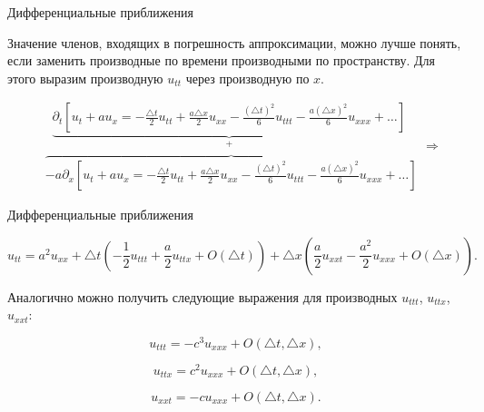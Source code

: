 \documentclass[10pt,xcolor=pst,aspectratio=169]{beamer}
\begin{document}
\begin{frame}{Дифференциальные приближения}

    \transdissolve[duration=0.1]
    \justifying
    \large

    Значение членов, входящих в погрешность аппроксимации, можно лучше понять, если заменить производные по времени производными по пространству. Для этого
выразим производную $u_{tt}$ через производную по $x$.

    \[
        \begin{split}
            &\; \; \underbrace{\partial_{t} \left[ u_{t} + a u_{x} = - \frac{\triangle t}{2} u_{tt} + \frac{a \triangle x}{2} u_{xx} - \frac{\left( \triangle t \right)^{2}}{6} u_{ttt} - \frac{a \left( \triangle x \right)^{2}}{6} u_{xxx} + \ldots \right]}_{+}\\
            &\overbrace{- a \partial_{x} \left[ u_{t} + a u_{x} = - \frac{\triangle t}{2} u_{tt} + \frac{a \triangle x}{2} u_{xx} - \frac{\left( \triangle t \right)^{2}}{6} u_{ttt} - \frac{a \left( \triangle x \right)^{2}}{6} u_{xxx} + \ldots \right]}
        \end{split}
        \Rightarrow
    \]

\end{frame}

\begin{frame}{Дифференциальные приближения}

    \transdissolve[duration=0.1]
    \justifying
    \large

    \[
        u_{tt} = a^{2} u_{xx} + \triangle t \left( - \frac{1}{2} u_{ttt} + \frac{a}{2} u_{ttx} + \mathit{O} \left( \triangle t \right) \right) + \triangle x \left( \frac{a}{2} u_{xxt} - \frac{a^{2}}{2} u_{xxx}  + \mathit{O} \left( \triangle x \right) \right).
    \]

    Аналогично можно получить следующие выражения для производных $u_{ttt}$, $u_{ttx}$, $u_{xxt}$:

    \[
        u_{ttt} = - c^{3} u_{xxx} + \mathit{O} \left( \triangle t, \triangle x \right),
    \]

    \[
        u_{ttx} = c^{2} u_{xxx} + \mathit{O} \left( \triangle t, \triangle x \right),
    \]

    \[
        u_{xxt} = - c u_{xxx} + \mathit{O} \left( \triangle t, \triangle x \right).
    \]

\end{frame}
\end{document}
